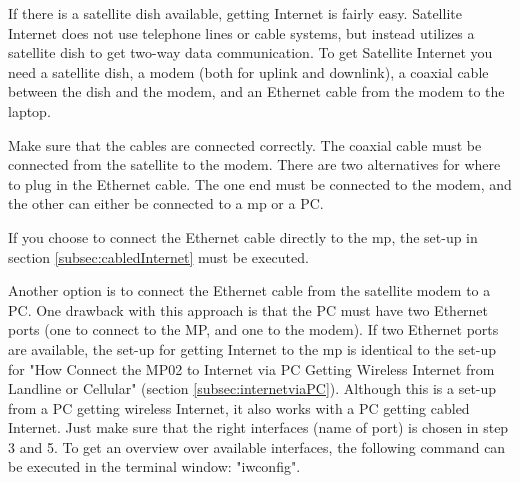 If there is a satellite dish available, getting Internet is fairly easy. Satellite Internet does not use telephone lines or cable systems, but instead utilizes a satellite dish to get two-way data communication. To get Satellite Internet you need a satellite dish, a modem (both for uplink and downlink), a coaxial cable between the dish and the modem, and an Ethernet cable from the modem to the laptop. 

Make sure that the cables are connected correctly. The coaxial cable must be connected from the satellite to the modem. There are two alternatives for where to plug in the Ethernet cable. The one end must be connected to the modem, and the other can either be connected to a \gls{mp} or a PC.

If you choose to connect the Ethernet cable directly to the \gls{mp}, the set-up in section \ref{subsec:cabledInternet} must be executed. 

Another option is to connect the Ethernet cable from the satellite modem to a PC. One drawback with this approach is that the PC must have two Ethernet ports (one to connect to the MP, and one to the modem). If two Ethernet ports are available, the set-up for getting Internet to the \gls{mp} is identical to the set-up for "How Connect the MP02 to Internet via PC Getting Wireless Internet from Landline or Cellular" (section \ref{subsec:internetviaPC}). Although this is a set-up from a PC getting wireless Internet, it also works with a PC getting cabled Internet. Just make sure that the right interfaces (name of port) is chosen in step 3 and 5. To get an overview over available interfaces, the following command can be executed in the terminal window: "iwconfig". 


